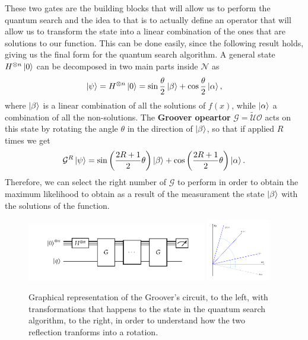 These two gates are the building blocks that will allow us to perform the quantum search and the idea to that is to actually define an operator that will allow us to transform the state into a linear combination of the ones that are solutions to our function. This can be done easily, since the following result holds, giving us the final form for the quantum search algorithm.
{
    A general state $H^{\otimes n}\ket{0}$ can be decomposed in two main parts inside $\mathcal{N}$ as
    \begin{equation}
        \ket{\psi} = H^{\otimes n}\ket{0} = \sin\frac{\theta}{2}\ket{\beta} + \cos\frac{\theta}{2}\ket{\alpha},
    \end{equation}
    where $\ket{\beta}$ is a linear combination of all the solutions of $f(x)$, while $\ket{\alpha}$ a combination of all the non-solutions. The \textbf{Groover opeartor} $\mathcal{G} = \tilde{\mathcal{U}}\mathcal{O}$ acts on this state by rotating the angle $\theta$ in the direction of $\ket{\beta}$, so that if applied $R$ times we get
    \begin{equation}
        \mathcal{G}^R\ket{\psi} = \sin\left( \frac{2R + 1}{2}\theta \right)\ket{\beta} + \cos\left( \frac{2R + 1}{2}\theta \right)\ket{\alpha}.
    \end{equation}
    Therefore, we can select the right number of $\mathcal{G}$ to perform in order to obtain the maximum likelihood to obtain as a result of the measurament the state $\ket{\beta}$ with the solutions of the function.
}
\begin{figure}[t]
    \centering
    \includegraphics[width=0.7\textwidth]{Immagini/Groover.pdf}
    \includegraphics[width=0.25\textwidth]{Immagini/TrasfGrov.pdf}
    \caption
    {
        Graphical representation of the Groover's circuit, to the left, with transformations that happens to the state in the quantum search algorithm, to the right, in order to understand how the two reflection tranforms into a rotation.
    }
    \label{fig:Groover}
\end{figure}
